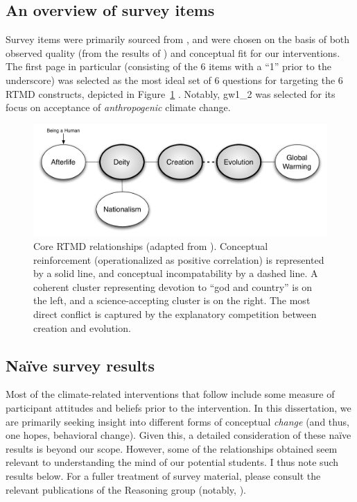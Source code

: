 \subsection{An overview of survey items}

Survey items were primarily sourced from \textcite{martinez_factors_2009}, and
were chosen on the basis of both observed quality (from the results of
\cite{martinez_factors_2009}) and conceptual fit for our interventions. The
first page in particular (consisting of the 6 items with a “1” prior to the
underscore) was selected as the most ideal set of 6 questions for targeting the
6 RTMD constructs, depicted in Figure~\ref{fig:rtmd}
\parencite{ranney_why_2012}.  Notably, \textsf{gw1_2} was selected for its focus
on acceptance of \emph{anthropogenic} climate change.

\begin{figure}
    \includegraphics[width=6.5in]{rtmd.pdf}
    \caption{Core RTMD relationships (adapted from \cite{ranney_why_2012}).
        Conceptual reinforcement (operationalized as positive correlation) is
        represented by a solid line, and conceptual incompatability by a dashed
        line. A coherent cluster representing devotion to “god and country” is
        on the left, and a science-accepting cluster is on the right. The most
        direct conflict is captured by the explanatory competition between
        creation and evolution.}
    \label{fig:rtmd}
\end{figure}

\subsection{Na\"ive survey results}

Most of the climate-related interventions that follow include some measure of
participant attitudes and beliefs prior to the intervention. In this
dissertation, we are primarily seeking insight into different forms of
conceptual \emph{change} (and thus, one hopes, behavioral change). Given this, a
detailed consideration of these na\"ive results is beyond our scope. However,
some of the relationships obtained seem relevant to understanding the mind of
our potential students. I thus note such results below. For a fuller treatment
of survey material, please consult the relevant publications of the Reasoning
group (notably, \cite{cohen_san_2012_f,ranney_changing_2012}).

